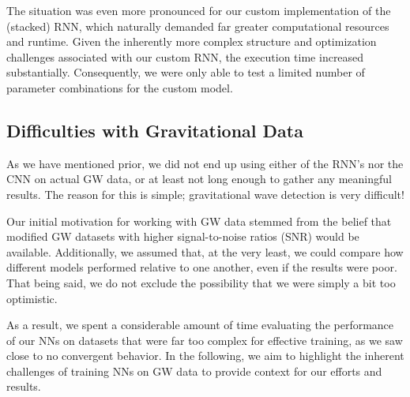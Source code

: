 \documentclass[%
reprint,
amsmath,amssymb,
aps,
]{revtex4-2}
\begin{document}
The situation was even more pronounced for our custom implementation of the (stacked) RNN, which naturally demanded far greater computational resources and runtime. Given the inherently more complex structure and optimization challenges associated with our custom RNN, the execution time increased substantially. Consequently, we were only able to test a limited number of parameter combinations for the custom model. 



\subsection{Difficulties with Gravitational Data}
As we have mentioned prior, we did not end up using either of the RNN's nor the CNN on actual GW data, or at least not long enough to gather any meaningful results. The reason for this is simple; gravitational wave detection is very difficult! 

Our initial motivation for working with GW data stemmed from the belief that modified GW datasets with higher signal-to-noise ratios (SNR) would be available. Additionally, we assumed that, at the very least, we could compare how different models performed relative to one another, even if the results were poor. That being said, we do not exclude the possibility that we were simply a bit too optimistic. 

As a result, we spent a considerable amount of time evaluating the performance of our NNs on datasets that were far too complex for effective training, as we saw close to no convergent behavior. In the following, we aim to highlight the inherent challenges of training NNs on GW data to provide context for our efforts and results. 
\end{document}
